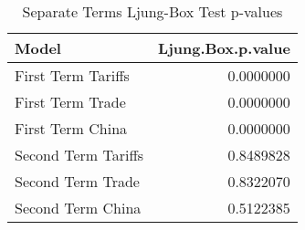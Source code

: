 \begin{table}

\caption{Separate Terms Ljung-Box Test p-values}
\centering
\begin{tabular}[t]{l|r}
\hline
Model & Ljung.Box.p.value\\
\hline
First Term Tariffs & 0.0000000\\
\hline
First Term Trade & 0.0000000\\
\hline
First Term China & 0.0000000\\
\hline
Second Term Tariffs & 0.8489828\\
\hline
Second Term Trade & 0.8322070\\
\hline
Second Term China & 0.5122385\\
\hline
\end{tabular}
\end{table}
